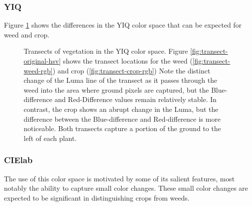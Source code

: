 \documentclass[letterpaper, notitlepage]{report}
\begin{document}
\subsubsection{YIQ}
Figure \ref{fig:transects-yiq} shows the differences in the YIQ color space that can be expected for weed and crop.

\begin{figure}[!htb]
	\centering
	\hfill
	\hfill
	\caption[YIQ Transects]{Transects of vegetation in the YIQ color space. Figure \ref{fig:transect-original-hsv} shows the transect locations for the weed (\ref{fig:transect-weed-rgb}) and crop (\ref{fig:transect-crop-rgb}) Note the distinct change of the Luma line of the transect as it passes through the weed into the area where ground pixels are captured, but the Blue-difference and Red-Difference values remain relatively stable.  In contrast, the crop shows an abrupt change in the Luma, but the difference between the Blue-difference and Red-difference is more noticeable. Both transects capture a portion of the ground to the left of each plant.}
	\label{fig:transects-yiq}
\end{figure}


\subsubsection{CIElab}
The use of this color space is motivated by some of its salient features, most notably the ability to capture small color changes. These small color changes are expected to be significant in distinguishing crops from weeds.
\end{document}
